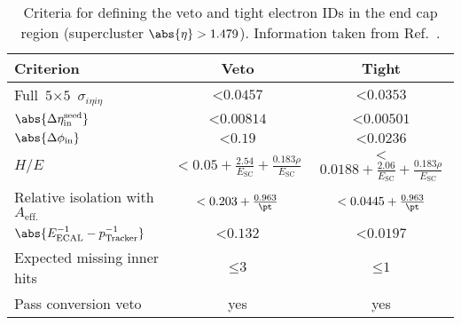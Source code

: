 \begin{table}[htbp]
    \centering
    \begin{tabular}{lcc}
    \toprule
    Criterion & Veto & Tight \\\midrule
    Full $\text{5} \times \text{5}$ $\sigma_{i\eta i\eta}$ & $< \text{0.0457}$ & $< \text{0.0353}$    \\
    $\abs{\Delta\eta_{\mathrm{in}}^{\mathrm{seed}}}$ & $< \text{0.00814}$ & $< \text{0.00501}$ \\
    $\abs{\Delta\phi_{\mathrm{in}}}$ & $< \text{0.19}$ & $< \text{0.0236}$ \\
    $H/E$ & $<\text{0.05} + \frac{\text{2.54}}{E_{\mathrm{SC}}} + \frac{\text{0.183}\rho}{E_{\mathrm{SC}}}$ & $<$ $\text{0.0188} + \frac{\text{2.06}}{E_{\mathrm{SC}}} + \frac{\text{0.183}\rho}{E_{\mathrm{SC}}}$ \\
    Relative isolation with $A_{\mathrm{eff.}}$ & $< \text{0.203} + \frac{\text{0.963}}{\pt}$ & $< \text{0.0445} + \frac{\text{0.963}}{\pt}$\\
    $\abs{E^{-1}_{\mathrm{ECAL}} - p^{-1}_{\mathrm{Tracker}}}$ & $< \text{0.132}$ & $< \text{0.0197}$\\
    Expected missing inner hits & $\leq \text{3}$ & $\leq \text{1}$\\
    Pass conversion veto & yes & yes \\
    \bottomrule
    \end{tabular}
    \caption[Criteria for defining the veto and tight electron IDs in the end cap region (supercluster $\abs{\eta} > \text{1.479}$)]{Criteria for defining the veto and tight electron IDs in the end cap region (supercluster $\abs{\eta} > \text{1.479}$). Information taken from Ref.~.}
    \label{tab:htoinv_electron_ID_endcap}
\end{table}

